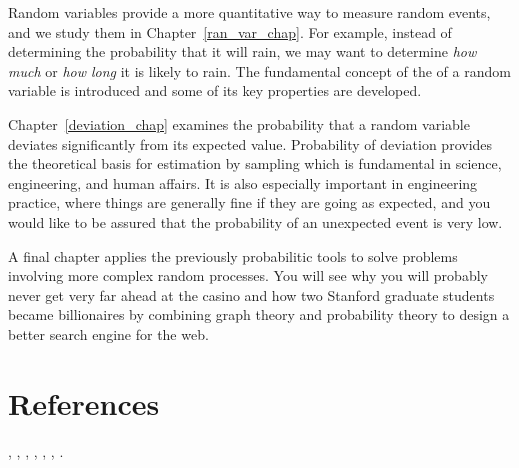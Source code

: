 Random variables provide a more quantitative way to measure random
events, and we study them in Chapter~\ref{ran_var_chap}.  For example,
instead of determining the probability that it will rain, we may want
to determine \emph{how much} or \emph{how long} it is likely to rain.
The fundamental concept of the  of a random
variable is introduced and some of its key properties are developed.

Chapter~\ref{deviation_chap} examines the probability that a random
variable deviates significantly from its expected value.  Probability
of deviation provides the theoretical basis for estimation by sampling
which is fundamental in science, engineering, and human affairs.  It
is also especially important in engineering practice, where things are
generally fine if they are going as expected, and you would like to be
assured that the probability of an unexpected event is very low.


A final chapter applies the previously probabilitic tools to solve
problems involving more complex random processes.  You will see why
you will probably never get very far ahead at the casino and how two
Stanford graduate students became billionaires by combining graph
theory and probability theory to design a better search engine for the
web.

\section{References}
 \cite{Feller68v1},
 \cite{GrinsteadS},
 \cite{LawlerC1999},
 \cite{Mitzenmacher2005},
 \cite{Ross2001},
 \cite{Ross2002},
 \cite{Williams2001}.

\endinput
